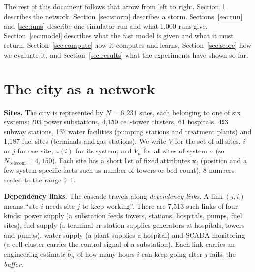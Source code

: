 \documentclass[11pt]{article}
\begin{document}
The rest of this document follows that arrow from left to right. Section~\ref{sec:network} describes the network. Section~\ref{sec:storm} describes a storm. Sections~\ref{sec:run} and \ref{sec:runs} describe one simulator run and what 1,000 runs give. Section~\ref{sec:model} describes what the fast model is given and what it must return, Section~\ref{sec:compute} how it computes and learns, Section~\ref{sec:score} how we evaluate it, and Section~\ref{sec:results} what the experiments have shown so far.

\section{The city as a network}\label{sec:network}

\textbf{Sites.} The city is represented by $N = 6{,}231$ sites, each belonging to one of six systems: 203 power substations, 4,150 cell-tower clusters, 61 hospitals, 493 subway stations, 137 water facilities (pumping stations and treatment plants) and 1,187 fuel sites (terminals and gas stations). We write $V$ for the set of all sites, $i$ or $j$ for one site, $a(i)$ for its system, and $V_a$ for all sites of system $a$ (so $N_{\text{telecom}} = 4{,}150$). Each site has a short list of fixed attributes $\mathbf x_i$ (position and a few system-specific facts such as number of towers or bed count), 8 numbers scaled to the range 0--1.

\textbf{Dependency links.} The cascade travels along \emph{dependency links}. A link $(j,i)$ means ``site $i$ needs site $j$ to keep working''. There are 7,513 such links of four kinds: power supply (a substation feeds towers, stations, hospitals, pumps, fuel sites), fuel supply (a terminal or station supplies generators at hospitals, towers and pumps), water supply (a plant supplies a hospital) and SCADA monitoring (a cell cluster carries the control signal of a substation). Each link carries an engineering estimate $\bar b_{ji}$ of how many hours $i$ can keep going after $j$ fails: the \emph{buffer}.
\end{document}
